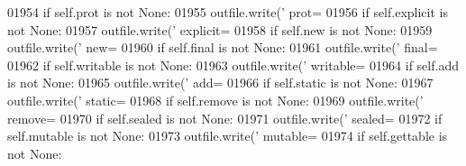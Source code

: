 \begin{DoxyCode}
{{{{{{{{{{{{{{{{{{{{{{{{{{{{{{{{{{{{{{{{{{{{{{{{{{{{{{{{{{{{{{{{{{{{{{{{{{{{{{{{{{{{{{{{{{{{{{{{{{{{{{{{{{{{{{{{{{{{{{{{{{{01954         \textcolor{keywordflow}{if} self.prot \textcolor{keywordflow}{is} \textcolor{keywordflow}{not} \textcolor{keywordtype}{None}:
01955             outfile.write(\textcolor{stringliteral}{' prot=%
01956         \textcolor{keywordflow}{if} self.explicit \textcolor{keywordflow}{is} \textcolor{keywordflow}{not} \textcolor{keywordtype}{None}:
01957             outfile.write(\textcolor{stringliteral}{' explicit=%
01958         \textcolor{keywordflow}{if} self.new \textcolor{keywordflow}{is} \textcolor{keywordflow}{not} \textcolor{keywordtype}{None}:
01959             outfile.write(\textcolor{stringliteral}{' new=%
01960         \textcolor{keywordflow}{if} self.final \textcolor{keywordflow}{is} \textcolor{keywordflow}{not} \textcolor{keywordtype}{None}:
01961             outfile.write(\textcolor{stringliteral}{' final=%
01962         \textcolor{keywordflow}{if} self.writable \textcolor{keywordflow}{is} \textcolor{keywordflow}{not} \textcolor{keywordtype}{None}:
01963             outfile.write(\textcolor{stringliteral}{' writable=%
01964         \textcolor{keywordflow}{if} self.add \textcolor{keywordflow}{is} \textcolor{keywordflow}{not} \textcolor{keywordtype}{None}:
01965             outfile.write(\textcolor{stringliteral}{' add=%
01966         \textcolor{keywordflow}{if} self.static \textcolor{keywordflow}{is} \textcolor{keywordflow}{not} \textcolor{keywordtype}{None}:
01967             outfile.write(\textcolor{stringliteral}{' static=%
01968         \textcolor{keywordflow}{if} self.remove \textcolor{keywordflow}{is} \textcolor{keywordflow}{not} \textcolor{keywordtype}{None}:
01969             outfile.write(\textcolor{stringliteral}{' remove=%
01970         \textcolor{keywordflow}{if} self.sealed \textcolor{keywordflow}{is} \textcolor{keywordflow}{not} \textcolor{keywordtype}{None}:
01971             outfile.write(\textcolor{stringliteral}{' sealed=%
01972         \textcolor{keywordflow}{if} self.mutable \textcolor{keywordflow}{is} \textcolor{keywordflow}{not} \textcolor{keywordtype}{None}:
01973             outfile.write(\textcolor{stringliteral}{' mutable=%
01974         \textcolor{keywordflow}{if} self.gettable \textcolor{keywordflow}{is} \textcolor{keywordflow}{not} \textcolor{keywordtype}{None}:
}}}}}}}}}}}}}}}}}}}}}}}}}}}}}}}}}}}}}}}}}}}}}}}}}}}}}}}}}}}}}}}}}}}}}}}}}}}}}}}}}}}}}}}}}}}}}}}}}}}}}}}}}}}}}}}}}}}}}}}}}}}}}}}}}}}}}
\end{DoxyCode}
